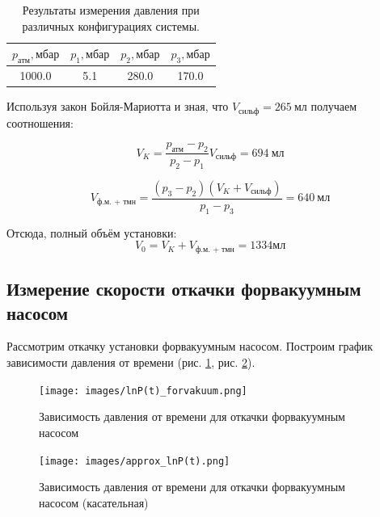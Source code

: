 \documentclass[a4paper, 12pt]{article}
\begin{document}
        \begin{table}[H]
            \centering
            \begin{tabular}{|c|c|c|c|}
                \hline
                $p_{атм}, мбар$ & $p_1, мбар$ & $p_2, мбар$ & $p_3, мбар$ \\ \hline
                1000.0 & 5.1 & 280.0 & 170.0 \\ \hline
            \end{tabular}
            \caption{Результаты измерения давления при различных конфигурациях системы.}
            \label{tab:results_of_measuring_for_value}
        \end{table}

        Используя закон Бойля-Мариотта и зная, что $V_{\text{сильф}} = 265 \: \text{мл}$ получаем соотношения:
	
        \begin{equation}
            V_{K} = \frac{p_{\text{атм}} - p_{2}}{p_{2} - p_{1}}V_{\text{сильф}} = 694 \: \text{мл}
            \label{eq:value_of_vacuum_cam}
        \end{equation}
	
	\begin{equation}
            V_{\text{ф.м. + тмн}} = \frac{ \left( p_{3} - p_{2}\right)\left(V_{K} + V_{\text{сильф}}\right) }{p_{1} - p_{3}} = 640 \: \text{мл}
		\label{eq:value_of_forvacuum_tube}
	\end{equation}

        Отсюда, полный объём установки:
        $$
        \boxed{V_0 = V_{K} + V_{\text{ф.м. + тмн}} = 1334 \text{мл}}
        $$
 
        \subsection*{Измерение скорости откачки форвакуумным насосом}
            Рассмотрим откачку установки форвакуумным насосом. Построим график зависимости давления от времени (рис. \ref{graph:forvakuum}, рис. \ref{graph:approx_forvakuum}).

            \begin{figure}[H]
                \centering
                \texttt{[image: images/lnP(t)\_forvakuum.png]}
                \caption{Зависимость давления от времени для откачки форвакуумным насосом}
                \label{graph:forvakuum}
            \end{figure}
            
            \begin{figure}[H]
                \centering
                \texttt{[image: images/approx\_lnP(t).png]}
                \caption{Зависимость давления от времени для откачки форвакуумным насосом (касательная)}
                \label{graph:approx_forvakuum}
            \end{figure}
\end{document}
